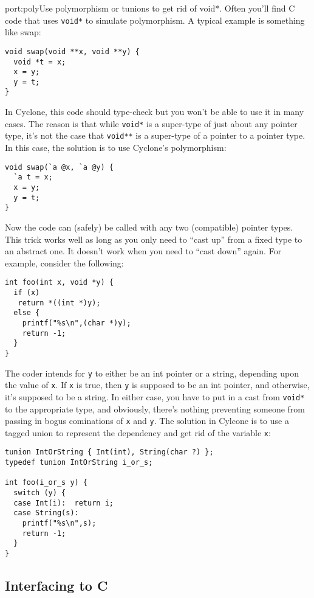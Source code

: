 \begin{porta}{port:poly}{Use polymorphism or tunions to get rid of void*.}  
Often you'll find C code that uses \texttt{void*} to simulate
polymorphism.  A typical example is something like swap:
\begin{verbatim}
void swap(void **x, void **y) {
  void *t = x;
  x = y;
  y = t;
}
\end{verbatim}
In Cyclone, this code should type-check but you won't be able
to use it in many cases.  The reason is that while \texttt{void*}
is a super-type of just about any pointer type, it's not the
case that \texttt{void**} is a super-type of a pointer to a
pointer type.  In this case, the solution is to use Cyclone's
polymorphism:
\begin{verbatim}
void swap(`a @x, `a @y) {
  `a t = x;
  x = y;
  y = t;
}
\end{verbatim}
Now the code can (safely) be called with any two (compatible)
pointer types.  This trick works well as long as you only need
to ``cast up'' from a fixed type to an abstract one.  It doesn't
work when you need to ``cast down'' again.  For example, consider
the following:
\begin{verbatim}
int foo(int x, void *y) {
  if (x)
   return *((int *)y);
  else {
    printf("%s\n",(char *)y);
    return -1;
  }
}
\end{verbatim}
The coder intends for \texttt{y} to either be an int pointer or
a string, depending upon the value of \texttt{x}.  If \texttt{x}
is true, then \texttt{y} is supposed to be an int pointer, and
otherwise, it's supposed to be a string.  In either case, you have
to put in a cast from \texttt{void*} to the appropriate type,
and obviously, there's nothing preventing someone from passing
in bogus cominations of \texttt{x} and \texttt{y}.  The solution
in Cylcone is to use a tagged union to represent the dependency
and get rid of the variable \texttt{x}:
\begin{verbatim}
tunion IntOrString { Int(int), String(char ?) };
typedef tunion IntOrString i_or_s;

int foo(i_or_s y) {
  switch (y) {
  case Int(i):  return i;
  case String(s):  
    printf("%s\n",s);
    return -1;
  }
}
\end{verbatim}
\end{porta}

\subsection{Interfacing to C}

